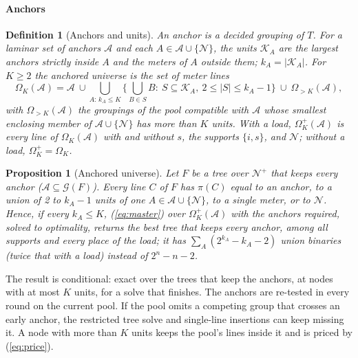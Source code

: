 \documentclass[journal,onecolumn,11pt]{IEEEtran}
\newtheorem{proposition}{Proposition}
\newtheorem{definition}{Definition}
\newcommand{\Nset}{\mathcal{N}}
\newcommand{\Aset}{\mathcal{A}}
\newcommand{\Kset}{\mathcal{K}}
\newcommand{\Gset}{\mathcal{G}}
\begin{document}
\paragraph*{Anchors}
\begin{definition}[Anchors and units]
An \emph{anchor} is a decided grouping of $T$. For a laminar set of anchors $\Aset$ and each $A\in\Aset\cup\{\Nset\}$, the
\emph{units} $\Kset_A$ are the largest anchors strictly inside $A$ and the meters of $A$ outside them; $k_A=|\Kset_A|$. For
$K\ge2$ the \emph{anchored universe} is the set of meter lines
\begin{equation}\label{eq:universe}
\Omega_K(\Aset)=\Aset\ \cup\bigcup_{A:\,k_A\le K}\Big\{\textstyle\bigcup_{B\in S}B:\ S\subseteq\Kset_A,\ 2\le|S|\le k_A-1\Big\}
\ \cup\ \Omega_{>K}(\Aset),
\end{equation}
with $\Omega_{>K}(\Aset)$ the groupings of the pool compatible with $\Aset$ whose smallest enclosing member of
$\Aset\cup\{\Nset\}$ has more than $K$ units. With a load, $\Omega^+_K(\Aset)$ is every line of $\Omega_K(\Aset)$ with and
without $s$, the supports $\{i,s\}$, and $\Nset$; without a load, $\Omega^+_K=\Omega_K$.
\end{definition}
\begin{proposition}[Anchored universe]\label{prop:anchor}
Let $F$ be a tree over $\Nset^+$ that keeps every anchor ($\Aset\subseteq\Gset(F)$). Every line $C$ of $F$ has $\pi(C)$ equal
to an anchor, to a union of 2 to $k_A-1$ units of one $A\in\Aset\cup\{\Nset\}$, to a single meter, or to $\Nset$. Hence, if
every $k_A\le K$, (\ref{eq:master}) over $\Omega^+_K(\Aset)$ with the anchors required, solved to optimality, returns the
best tree that keeps every anchor, among all supports and every place of the load; it has $\sum_A(2^{k_A}-k_A-2)$ union
binaries (twice that with a load) instead of $2^n-n-2$.
\end{proposition}
The result is conditional: exact over the trees that keep the anchors, at nodes with at most $K$ units, for a solve that
finishes. The anchors are re-tested in every round on the current pool. If the pool omits a competing group
that crosses an early anchor, the restricted tree solve and single-line insertions can keep missing it. A node with
more than $K$ units keeps the pool's lines inside it and is priced by (\ref{eq:price}).
\end{document}
